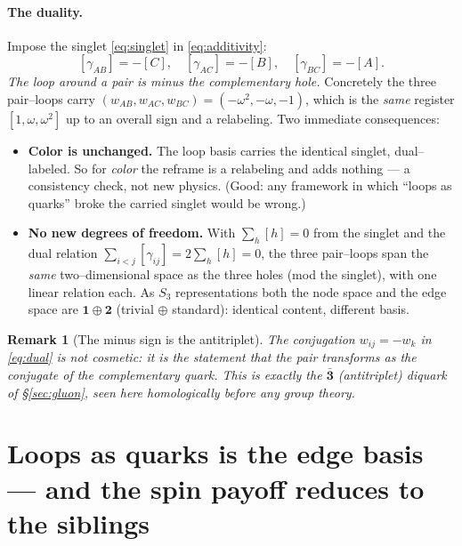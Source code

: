 \documentclass[11pt,oneside]{article}
\newcommand{\bn}{\bar{\mathbf{3}}}
\theoremstyle{plain}
\newtheorem{remark}{Remark}
\begin{document}
\paragraph{The duality.}
Impose the singlet \eqref{eq:singlet} in \eqref{eq:additivity}:
\begin{equation}
  \boxed{\;[\gamma_{AB}]=-[C],\quad [\gamma_{AC}]=-[B],\quad [\gamma_{BC}]=-[A].\;}
  \label{eq:dual}
\end{equation}
\emph{The loop around a pair is minus the complementary hole.} Concretely the
three pair--loops carry $(w_{AB},w_{AC},w_{BC})=(-\omega^2,-\omega,-1)$, which is
the \emph{same} register $[1,\omega,\omega^2]$ up to an overall sign and a
relabeling. Two immediate consequences:
\begin{itemize}[leftmargin=1.6em]
  \item \textbf{Color is unchanged.} The loop basis carries the identical singlet,
        dual--labeled. So for \emph{color} the reframe is a relabeling and adds
        nothing --- a consistency check, not new physics. (Good: any framework in
        which ``loops as quarks'' broke the carried singlet would be wrong.)
  \item \textbf{No new degrees of freedom.} With $\sum_h[h]=0$ from the singlet
        and the dual relation $\sum_{i<j}[\gamma_{ij}]=2\sum_h[h]=0$, the three
        pair--loops span the \emph{same} two--dimensional space as the three holes
        (mod the singlet), with one linear relation each. As $S_3$
        representations both the node space and the edge space are
        $\mathbf 1\oplus\mathbf 2$ (trivial $\oplus$ standard): identical content,
        different basis.
\end{itemize}

\begin{remark}[The minus sign is the antitriplet]
The conjugation $w_{ij}=-w_k$ in \eqref{eq:dual} is not cosmetic: it is the
statement that the pair transforms as the \emph{conjugate} of the complementary
quark. This is exactly the $\bn$ (antitriplet) diquark of \S\ref{sec:gluon}, seen
here homologically before any group theory.
\end{remark}

\section{Loops as quarks is the edge basis --- and the spin payoff reduces to
the siblings}
\label{sec:spin}
\end{document}

